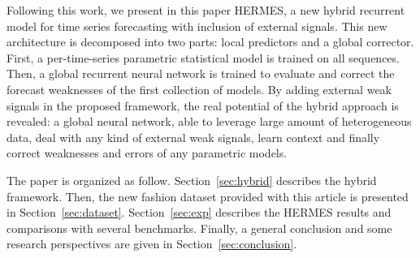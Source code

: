 \documentclass{article} %
\begin{document}

Following this work, we present in this paper HERMES, a new hybrid recurrent model for time series forecasting with inclusion of external signals. This new architecture is decomposed  into two parts: local predictors and a global corrector.  First, a per-time-series parametric statistical model is trained on all sequences. Then, a global recurrent neural network is trained to evaluate and correct the forecast weaknesses of the first collection of models. By adding external weak signals in the proposed framework, the real potential of the hybrid approach is revealed: a global neural network, able to leverage large amount of heterogeneous data, deal with any kind of external weak signals, learn context and finally correct weaknesses and errors of any parametric models.



The paper is organized as follow. Section~\ref{sec:hybrid} describes the hybrid framework. Then, the new fashion dataset provided with this article is presented in Section~\ref{sec:dataset}. Section~\ref{sec:exp} describes the HERMES results and comparisons with several benchmarks. Finally, a general conclusion and some research perspectives are given in  Section~\ref{sec:conclusion}.
\end{document}
